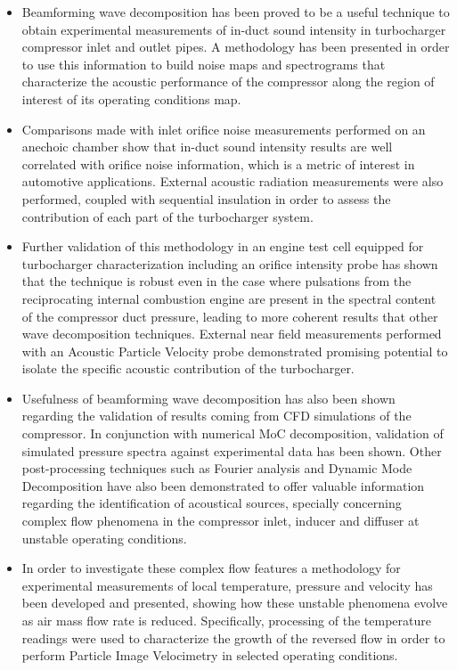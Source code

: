 \begin{itemize}

	\item Beamforming wave decomposition has been proved to be a useful technique to obtain experimental measurements of in-duct sound intensity in turbocharger compressor inlet and outlet pipes. A methodology has been presented in order to use this information to build noise maps and spectrograms that characterize the acoustic performance of the compressor along the region of interest of its operating conditions map.

	\item Comparisons made with inlet orifice noise measurements performed on an anechoic chamber show that in-duct sound intensity results are well correlated with orifice noise information, which is a metric of interest in automotive applications. External acoustic radiation measurements were also performed, coupled with sequential insulation in order to assess the contribution of each part of the turbocharger system. 

	\item Further validation of this methodology in an engine test cell equipped for turbocharger characterization including an orifice intensity probe has shown that the technique is robust even in the case where pulsations from the reciprocating internal combustion engine are present in the spectral content of the compressor duct pressure, leading to more coherent results that other wave decomposition techniques. External near field measurements performed with an Acoustic Particle Velocity probe demonstrated promising potential to isolate the specific acoustic contribution of the turbocharger.

	\item Usefulness of beamforming wave decomposition has also been shown regarding the validation of results coming from CFD simulations of the compressor. In conjunction with numerical MoC decomposition, validation of simulated pressure spectra against experimental data has been shown. Other post-processing techniques such as Fourier analysis and Dynamic Mode Decomposition have also been demonstrated to offer valuable information regarding the identification of acoustical sources, specially concerning complex flow phenomena in the compressor inlet, inducer and diffuser at unstable operating conditions.

	\item In order to investigate these complex flow features a methodology for experimental measurements of local temperature, pressure and velocity has been developed and presented, showing how these unstable phenomena evolve as air mass flow rate is reduced. Specifically, processing of the temperature readings were used to characterize the growth of the reversed flow in order to perform Particle Image Velocimetry in selected operating conditions. 


\end{itemize}

